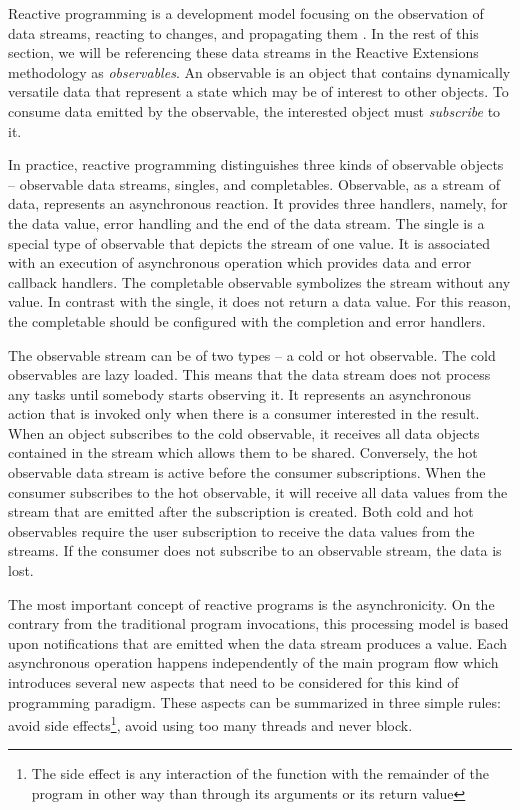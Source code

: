 \documentclass[oneside,
  digital, %
  table,   %
  lof,     %
  lot,     %
]{fithesis3}
\begin{document}
Reactive programming is a development model focusing on the observation of data streams, reacting to changes, and propagating them \cite{building_reactive_ms_in_java}. In the rest of this section, we will be referencing these data streams in the Reactive Extensions methodology as \textit{observables}. An observable is an object that contains dynamically versatile data that represent a state which may be of interest to other objects. To consume data emitted by the observable, the interested object must \textit{subscribe} to it.

In practice, reactive programming distinguishes three kinds of observable objects -- observable data streams, singles, and completables. Observable, as a stream of data, represents an asynchronous reaction. It provides three handlers, namely, for the data value, error handling and the end of the data stream. The single is a special type of observable that depicts the stream of one value. It is associated with an execution of asynchronous operation which provides data and error callback handlers. The completable observable symbolizes the stream without any value. In contrast with the single, it does not return a data value. For this reason, the completable should be configured with the completion and error handlers.

The observable stream can be of two types -- a cold or hot observable. The cold observables are lazy loaded. This means that the data stream does not process any tasks until somebody starts observing it. It represents an asynchronous action that is invoked only when there is a consumer interested in the result. When an object subscribes to the cold observable, it receives all data objects contained in the stream which allows them to be shared. Conversely, the hot observable data stream is active before the consumer subscriptions. When the consumer subscribes to the hot observable, it will receive all data values from the stream that are emitted after the subscription is created. Both cold and hot observables require the user subscription to receive the data values from the streams. If the consumer does not subscribe to an observable stream, the data is lost.

The most important concept of reactive programs is the asynchronicity. On the contrary from the traditional program invocations, this processing model is based upon notifications that are emitted when the data stream produces a value. Each asynchronous operation happens independently of the main program flow which introduces several new aspects that need to be considered for this kind of programming paradigm. These aspects can be summarized in three simple rules: avoid side effects\footnote{The side effect is any interaction of the function with the remainder of the program in other way than through its arguments or its return value}, avoid using too many threads and never block.
\end{document}
